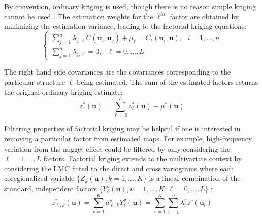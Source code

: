 By convention, ordinary kriging is used, though there is no reason simple kriging cannot be used \citep{hong2007improved}. The estimation weights for the $\ell^{th}$ factor are obtained by minimizing the estimation variance, leading to the factorial kriging equations:
\begin{equation*}
    \begin{cases}
        \sum_{j=1}^{n} \lambda_{j, \ell} C(\mathbf{u}_{i}, \mathbf{u}_{j}) + \mu_{\ell} = C_{\ell}(\mathbf{u}_{i}, \mathbf{u}), \ \ \ i=1,\dots,n \\
        \sum_{j=1}^{n} \lambda_{j, \ell} = 0, \ \ \ \ell = 0,\dots,L
    \end{cases}
\end{equation*}

The right hand side covariances are the covariances corresponding to the particular structure $\ell$ being estimated. The sum of the estimated factors returns the original ordinary kriging estimate:
\begin{equation*}
    z^{*}(\mathbf{u}) = \sum_{\ell=0}^{L} z_{\ell}^{*}(\mathbf{u}) + \mu^{*}(\mathbf{u})
\end{equation*}

Filtering properties of factorial kriging may be helpful if one is interested in removing a particular factor from estimated maps. For example, high-frequency variation from the nugget effect could be filtered by only considering the $\ell=1,\dots,L$ factors. Factorial kriging extends to the multivariate context by considering the LMC fitted to the direct and cross variograms where each coregionalized variable $\{Z_{k}(\mathbf{u}), k=1,\dots,K\}$ is a linear combination of the standard, independent factors $\{Y_{\ell}^{v}(\mathbf{u}), v=1,\dots,K; \ell=0,\dots,L\}$ \citep{wackernagel1988geostatistical}:
\begin{equation*}
    z^{*}_{\ell, k}(\mathbf{u}) = \sum_{v=1}^{K} a_{\ell, k}^{v} Y^{v}_{\ell}(\mathbf{u}) = \sum_{v=1}^{K}\sum_{i=1}^{n} \lambda_{i}^{v} z^{v}(\mathbf{u}_{i})
\end{equation*}


